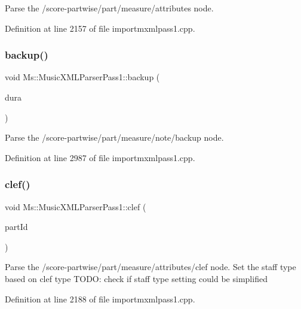 Parse the /score-\/partwise/part/measure/attributes node. 

Definition at line 2157 of file importmxmlpass1.\+cpp.

\mbox{\label{class_ms_1_1_music_x_m_l_parser_pass1_a551f4d1ca22cbccdab8fe8dce077512d}} 
\subsubsection{\texorpdfstring{backup()}{backup()}}
{\footnotesize\ttfamily void Ms\+::\+Music\+X\+M\+L\+Parser\+Pass1\+::backup (\begin{DoxyParamCaption}\item[{\hyperlink{class_ms_1_1_fraction}{Fraction} \&}]{dura }\end{DoxyParamCaption})}

Parse the /score-\/partwise/part/measure/note/backup node. 

Definition at line 2987 of file importmxmlpass1.\+cpp.

\mbox{\label{class_ms_1_1_music_x_m_l_parser_pass1_aaca33f48b413fe218783791896099fa8}} 
\subsubsection{\texorpdfstring{clef()}{clef()}}
{\footnotesize\ttfamily void Ms\+::\+Music\+X\+M\+L\+Parser\+Pass1\+::clef (\begin{DoxyParamCaption}\item[{const Q\+String \&}]{part\+Id }\end{DoxyParamCaption})}

Parse the /score-\/partwise/part/measure/attributes/clef node. Set the staff type based on clef type T\+O\+DO\+: check if staff type setting could be simplified 

Definition at line 2188 of file importmxmlpass1.\+cpp.

\mbox{\label{class_ms_1_1_music_x_m_l_parser_pass1_a20ea5b9e1776760bdbba0d5ccc2777fa}} 
